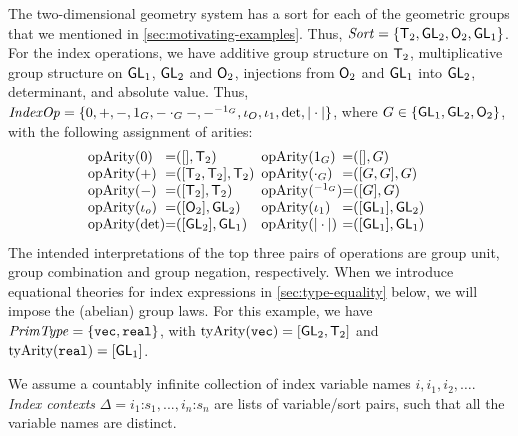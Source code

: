 \begin{example}
  \label{ex:two-dim-geo-operations}
  The two-dimensional geometry system has a sort for each of the
  geometric groups that we mentioned in
  \autoref{sec:motivating-examples}. Thus, $\mathit{Sort} =
  \{\mathsf{T}_2, \mathsf{GL}_2, \mathsf{O}_2, \mathsf{GL}_1 \}$. For the
  index operations, we have additive group structure on
  $\mathsf{T}_2$, multiplicative group structure on $\mathsf{GL}_1$,
  $\mathsf{GL}_2$ and $\mathsf{O}_2$, injections from $\mathsf{O}_2$ and
  $\mathsf{GL}_1$ into $\mathsf{GL}_2$, determinant, and absolute value. Thus,
  $\mathit{IndexOp} = \{ 0, +, -, 1_G, -\cdot_G-, -^{-1_G}, \iota_O,
  \iota_1, \det, |\cdot| \}$, where $G \in \{\mathsf{GL}_1, \mathsf{GL}_2,
  \mathsf{O}_2\}$, with the following assignment of arities:
  \begin{displaymath}
    \begin{array}{@{}l@{\hspace{0em}=\hspace{0em}}l@{\hspace{0.5em}}l@{\hspace{0em}=\hspace{0em}}l}
      \indexOpArity(0) & ([], \SynTransl{2}) &
      \indexOpArity(1_G) & ([], G) \\
      \indexOpArity(+) & ([\SynTransl{2}, \SynTransl{2}], \SynTransl{2}) &
      \indexOpArity(\cdot_G) & ([G,G],G) \\
      \indexOpArity(-) & ([\SynTransl{2}], \SynTransl{2}) &
      \indexOpArity(^{-1_G}) & ([G], G) \\
      \indexOpArity(\iota_o) & ([\SynOrth{2}], \SynGL{2}) &
      \indexOpArity(\iota_1) & ([\SynGL{1}], \SynGL{2}) \\
      \indexOpArity(\det) & ([\SynGL{2}], \SynGL{1}) &
      \indexOpArity(|\cdot|) & ([\SynGL{1}], \SynGL{1})
    \end{array}
  \end{displaymath}
  The intended interpretations of the top three pairs of operations
  are group unit, group combination and group negation,
  respectively. When we introduce equational theories for index
  expressions in \autoref{sec:type-equality} below, we will impose the
  (abelian) group laws. For this example, we have $\mathit{PrimType} = \{
  \textup{\texttt{vec}}, \textup{\texttt{real}} \}$, with
  $\mathrm{tyArity}(\textup{\texttt{vec}}) = [\mathsf{GL}_2, \mathsf{T}_2]$ and
  $\mathrm{tyArity}(\textup{\texttt{real}}) = [\mathsf{GL}_1]$.
\end{example}

We assume a countably infinite collection of index variable names $i,
i_1, i_2,\ldots$. \emph{Index contexts} $\Delta = i_1 \mathord: s_1,
..., i_n \mathord: s_n$ are lists of variable/sort pairs, such that
all the variable names are distinct.

